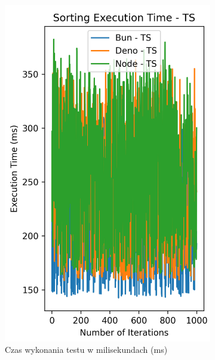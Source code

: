 \begin{figure}[H]
  \centering
  \begin{subfigure}[b]{0.4\textwidth}
    \centering
    \includegraphics[width=\textwidth]{Figures/sorting/sorting_bubble_1000_10000_ts_time.png}
    \caption{Czas wykonania testu w milisekundach (ms)}
    \label{fig:bubble_sorting_e2_ts_time}
  \end{subfigure}
  \begin{subfigure}[b]{0.4\textwidth}
    \centering

\end{subfigure}
\end{figure}
